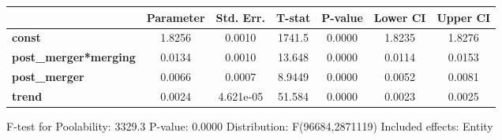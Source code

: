 \documentclass{report}a
\begin{document}
\begin{center}
\begin{tabular}{lcccccc}
                              & \textbf{Parameter} & \textbf{Std. Err.} & \textbf{T-stat} & \textbf{P-value} & \textbf{Lower CI} & \textbf{Upper CI}  \\
\midrule
\textbf{const}                &       1.8256       &       0.0010       &      1741.5     &      0.0000      &       1.8235      &       1.8276       \\
\textbf{post\_merger*merging} &       0.0134       &       0.0010       &      13.648     &      0.0000      &       0.0114      &       0.0153       \\
\textbf{post\_merger}         &       0.0066       &       0.0007       &      8.9449     &      0.0000      &       0.0052      &       0.0081       \\
\textbf{trend}                &       0.0024       &     4.621e-05      &      51.584     &      0.0000      &       0.0023      &       0.0025       \\
\bottomrule
\end{tabular}
\end{center}

F-test for Poolability: 3329.3 \newline
 P-value: 0.0000 \newline
 Distribution: F(96684,2871119) \newline
  \newline
 Included effects: Entity
\end{document}
